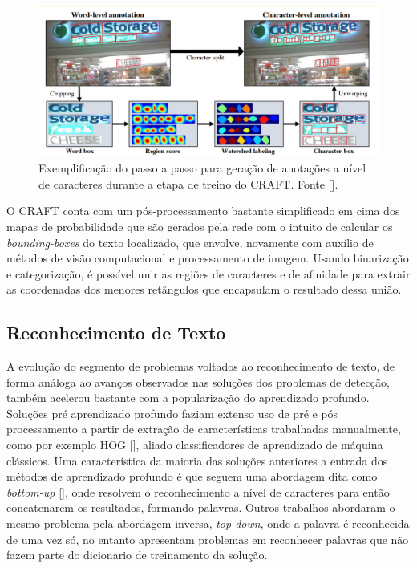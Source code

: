 \begin{figure}
    \centering
    \includegraphics[width=\textwidth]{figs/craft-char-level-annotation.png}
    \caption{Exemplificação do passo a passo para geração de anotações a nível de caracteres durante a etapa de treino do CRAFT. Fonte [].}
    \label{fig:craft_char_level_annotation}
\end{figure}

O CRAFT conta com um pós-processamento bastante simplificado em cima dos mapas de probabilidade que são gerados pela rede com o intuito de calcular os \textit{bounding-boxes} do texto localizado, que envolve, novamente com auxílio de métodos de visão computacional e processamento de imagem. Usando binarização e categorização, é possível unir as regiões de caracteres e de afinidade para extrair as coordenadas dos menores retângulos que encapsulam o resultado dessa união.


\subsection{Reconhecimento de Texto}
A evolução do segmento de problemas voltados ao reconhecimento de texto, de forma análoga ao avanços observados nas soluções dos problemas de detecção, também acelerou bastante com a popularização do aprendizado profundo. Soluções pré aprendizado profundo faziam extenso uso de pré e pós processamento a partir de extração de características trabalhadas manualmente, como por exemplo HOG [], aliado classificadores de aprendizado de máquina clássicos. Uma característica da maioria das soluções anteriores a entrada dos métodos de aprendizado profundo é que seguem uma abordagem dita como \textit{bottom-up} [], onde resolvem o reconhecimento a nível de caracteres para então concatenarem os resultados, formando palavras. Outros trabalhos abordaram o mesmo problema pela abordagem inversa, \textit{top-down}, onde a palavra é reconhecida de uma vez só, no entanto apresentam problemas em reconhecer palavras que não fazem parte do dicionario de treinamento da solução.

